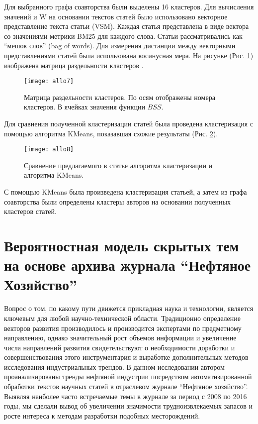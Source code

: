 Для выбранного графа соавторства были выделены 16 кластеров.
Для вычисления значений  и W на основании текстов статей было использовано векторное представление текста статьи (VSM). Каждая статья представлена в виде вектора со значениями метрики BM25 для каждого слова. Статьи рассматривались как ``мешок слов'' (bag of words). Для измерения дистанции между векторными представлениями статей была использована косинусная мера.
На рисунке (Рис. \ref{fig:allo7}) изображена матрица раздельности кластеров .

\begin{figure}[H]
  \caption{Матрица раздельности кластеров. По осям отображены номера кластеров. В ячейках значения функции $BSS$.}
  \centering
    \texttt{[image: allo7]}
  \label{fig:allo7}
\end{figure}  

Для сравнения полученной кластеризации статей была проведена кластеризация с помощью алгоритма KMeans, показавшая схожие результаты (Рис. \ref{fig:allo8}).

\begin{figure}[H]
  \caption{Сравнение предлагаемого в статье алгоритма кластеризации и алгоритма KMeans.}
  \centering
    \texttt{[image: allo8]}
  \label{fig:allo8}
\end{figure}  

С помощью KMeans была произведена кластеризация статьей, а затем из графа соавторства были определены кластеры авторов на основании полученных кластеров статей.

\section[Вероятностная модель текста]{Вероятностная модель скрытых тем на основе архива журнала ``Нефтяное Хозяйство''}

Вопрос о том, по какому пути движется прикладная наука и технологии, является ключевым для любой научно-технической области. 
Традиционно определение векторов развития производилось и производится экспертами по предметному направлению, однако значительный рост объемов информации и увеличение числа направлений развития свидетельствуют о необходимости доработки и совершенствования этого инструментария и выработке дополнительных методов исследования индустриальных трендов. 
В данном исследовании автором проанализированы тренды нефтяной индустрии посредством автоматизированной обработки текстов научных статей в отраслевом журнале ``Нефтяное хозяйство''. 
Выявляя наиболее часто встречаемые темы в журнале за период с 2008 по 2016 годы, мы сделали вывод об увеличении значимости трудноизвлекаемых запасов и росте интереса к методам разработки подобных месторождений. 

